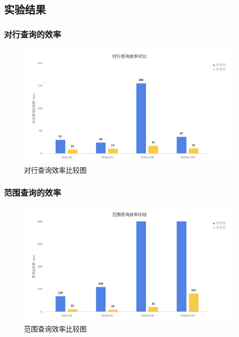 \documentclass[hyperref={unicode=true}]{beamer}
\begin{document}
\subsection{实验结果}
\begin{frame}\frametitle{对行查询的效率}
  \begin{figure}[H]
    \begin{center}
      \includegraphics[width=4.5in]{row.png}
      \caption{对行查询效率比较图}\label{fig:row}
    \end{center}
  \end{figure}
\end{frame}
\begin{frame}\frametitle{范围查询的效率}
  \begin{figure}[H]
    \begin{center}
      \includegraphics[width=4.5in]{query.png}
      \caption{范围查询效率比较图}\label{fig:query}
    \end{center}
  \end{figure}
\end{frame}
\end{document}
